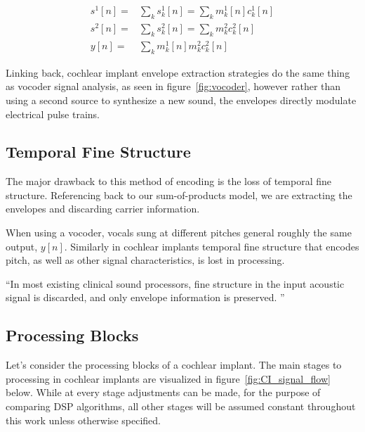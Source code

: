 \documentclass [11pt, proquest,oneside] {uwthesis}[2015/03/03]
\begin{document}
\begin{align}
\label{eq:sum-of-products}
s^1[n] =& \sum\limits_k s_k^1[n] = \sum\limits_k m^1_k[n] c^1_k[n] \\
s^2[n] =& \sum\limits_k s_k^2[n] = \sum\limits_k m^2_k c^2_k[n] \\
y[n] =& \sum\limits_k m_k^1[n] m^2_k c^2_k[n]
\end{align}

Linking back, cochlear implant envelope extraction strategies do the same thing as vocoder signal analysis, as seen in figure~\ref{fig:vocoder}, however rather than using a second source to synthesize a new sound, the envelopes directly modulate electrical pulse trains.

\subsection{Temporal Fine Structure}

The major drawback to this method of encoding is the loss of temporal fine structure.  Referencing back to our sum-of-products model, we are extracting the envelopes and discarding carrier information.

When using a vocoder, vocals sung at different pitches general roughly the same output, $y[n]$.  Similarly in cochlear implants temporal fine structure that encodes pitch, as well as other signal characteristics, is lost in processing.

``In most existing clinical sound processors, fine structure in the input acoustic signal is discarded, and only envelope information is preserved. ''  %


\subsection{Processing Blocks}

Let's consider the processing blocks of a cochlear implant.  The main stages to processing in cochlear implants are visualized in figure~\ref{fig:CI_signal_flow} below.  While at every stage adjustments can be made, for the purpose of comparing DSP algorithms, all other stages will be assumed constant throughout this work unless otherwise specified.
\end{document}
